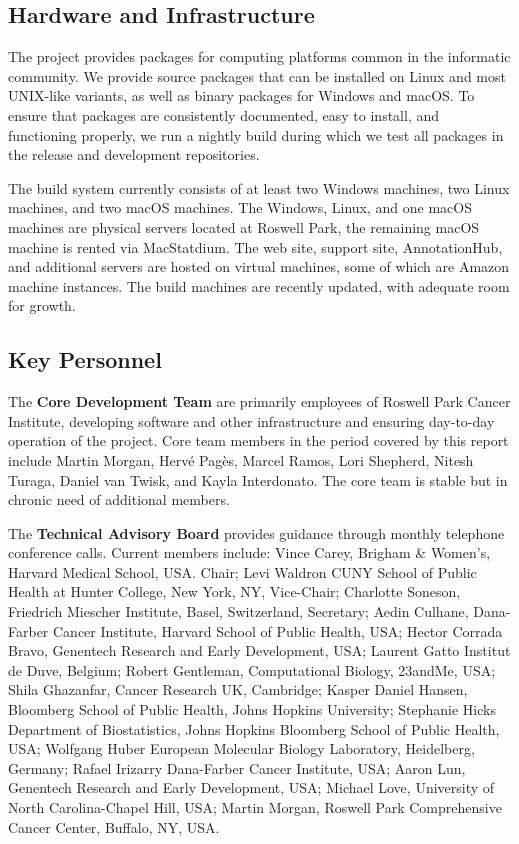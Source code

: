 \documentclass[letterpaper]{article}
\begin{document}
\subsection{Hardware and Infrastructure}
\label{sec:pkg_building}

The \Bioconductor{} project provides packages for computing platforms
common in the informatic community.  We provide source packages
that can be installed on Linux and most UNIX-like variants, as well as
binary packages for Windows and macOS.  To ensure that packages are
consistently documented, easy to install, and functioning properly, we
run a nightly build during which we test all packages in the release
and development repositories.  

The build system currently consists of at least two Windows machines,
two Linux machines, and two macOS machines. The Windows, Linux, and
one macOS machines are physical servers located at Roswell Park, the
remaining macOS machine is rented via MacStatdium. The web site,
support site, AnnotationHub, and additional servers are hosted on
virtual machines, some of which are Amazon machine instances. The
build machines are recently updated, with adequate room for growth.

\subsection{Key Personnel}
\label{sec:key_personnel}

The \textbf{Core Development Team} are primarily employees of Roswell
Park Cancer Institute, developing software and other infrastructure
and ensuring day-to-day operation of the project. Core team members in
the period covered by this report include Martin Morgan, Herv\'{e}
Pag\`{e}s, Marcel Ramos, Lori Shepherd, Nitesh Turaga, Daniel van
Twisk, and Kayla Interdonato. The core team is stable but in chronic
need of additional members.

The \textbf{Technical Advisory Board} provides guidance through
monthly telephone conference calls. Current members include: Vince
Carey, Brigham \& Women’s, Harvard Medical School, USA. Chair; Levi
Waldron CUNY School of Public Health at Hunter College, New York, NY,
Vice-Chair; Charlotte Soneson, Friedrich Miescher Institute, Basel,
Switzerland, Secretary; Aedin Culhane, Dana-Farber Cancer Institute,
Harvard School of Public Health, USA; Hector Corrada Bravo, Genentech
Research and Early Development, USA; Laurent Gatto Institut de Duve,
Belgium; Robert Gentleman, Computational Biology, 23andMe, USA; Shila
Ghazanfar, Cancer Research UK, Cambridge; Kasper Daniel Hansen,
Bloomberg School of Public Health, Johns Hopkins University; Stephanie
Hicks Department of Biostatistics, Johns Hopkins Bloomberg School of
Public Health, USA; Wolfgang Huber European Molecular Biology
Laboratory, Heidelberg, Germany; Rafael Irizarry Dana-Farber Cancer
Institute, USA; Aaron Lun, Genentech Research and Early Development,
USA; Michael Love, University of North Carolina-Chapel Hill, USA;
Martin Morgan, Roswell Park Comprehensive Cancer Center, Buffalo, NY,
USA.
\end{document}
